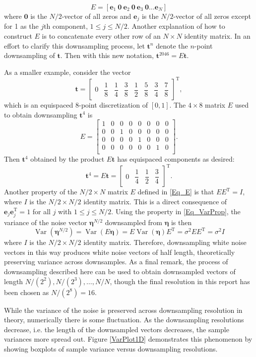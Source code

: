 \documentclass[12pt]{article}
\newcommand{\tdis}{\mathbf{t}}
\newcommand{\trans}{\mathrm{T}}	%
\newcommand{\noiseSD}{\sigma}	%
\newcommand{\noise}{\bm{\eta}}	%
\newcommand{\Var}{\operatorname{Var}}	%
\begin{document}
\begin{equation}
E = [\mathbf{e}_1 \: \mathbf{0} \: \mathbf{e}_2 \: \mathbf{0} \: \mathbf{e}_3 \: \mathbf{0} \ldots \mathbf{e}_N]
\label{Eq_E}
\end{equation}
where $\mathbf{0}$ is the $N/2$-vector of all zeros and $\mathbf{e}_j$ is the $N/2$-vector of all zeros except for 1 as the $j\text{th}$ component, $1 \leq j \leq N/2$. Another explanation of how to construct $E$ is to concatenate every other row of an $N \times N$ identity matrix. In an effort to clarify this downsampling process, let $\tdis^{n}$ denote the $n$-point downsampling of $\tdis$. Then with this new notation, $\tdis^{2046} = E\tdis$. \par
As a smaller example, consider the vector
\[\tdis = \begin{bmatrix}
0 & \dfrac{1}{8} & \dfrac{1}{4} & \dfrac{3}{8} & \dfrac{1}{2} & \dfrac{5}{8} & \dfrac{3}{4} & \dfrac{7}{8}
\end{bmatrix}^{\trans},\]
which is an equispaced 8-point discretization of $[0,1]$. The $4 \times 8$ matrix $E$ used to obtain downsampling $\tdis^{4}$ is
\[E = \begin{bmatrix}
1 & 0 & 0 & 0 & 0 & 0 & 0 & 0 \\
0 & 0 & 1 & 0 & 0 & 0 & 0 & 0 \\
0 & 0 & 0 & 0 & 1 & 0 & 0 & 0 \\
0 & 0 & 0 & 0 & 0 & 0 & 1 & 0 \\
\end{bmatrix}.\]
Then $\tdis^4$ obtained by the product $E\tdis$ has equispaced components as desired:
\[\tdis^4 = E\tdis = \begin{bmatrix}
0 & \dfrac{1}{4} & \dfrac{1}{2} & \dfrac{3}{4}
\end{bmatrix}^{\trans}.\]
\indent Another property of the $N/2 \times N$ matrix $E$ defined in \eqref{Eq_E} is that $EE^{\trans} = I$, where $I$ is the $N/2 \times N/2$ identity matrix.  This is a direct consequence of $\mathbf{e}_j\mathbf{e}_j^\trans = 1$ for all $j$ with $1 \leq j \leq N/2$. Using the property in \eqref{Eq_VarProp}, the variance of the  noise vector $\noise^{N/2}$ downsampled from $\noise$ is then
\[\Var(\noise^{N/2}) = \Var(E\noise) = E\Var(\noise)E^{\trans} = \noiseSD^2EE^{\trans} = \noiseSD^2I\]
where $I$ is the $N/2 \times N/2$ identity matrix. Therefore, downsampling white noise vectors in this way produces white noise vectors of half length, theoretically preserving variance across downsamples. As a final remark, the process of downsampling described here can be used to obtain downsampled vectors of length $N/(2^2), N/(2^3), \ldots, N/N$, though the final resolution in this report has been chosen as $N/(2^8) = 16$. \par 
While the variance of the noise is preserved across downsampling resolution in theory, numerically there is some fluctuation. As the downsampling resolutions decrease, i.e. the length of the downsampled vectors decreases, the sample variances more spread out. Figure \ref{VarPlot1D} demonstrates this phenomenon by showing boxplots of sample variance versus downsampling resolutions. 
\end{document}
